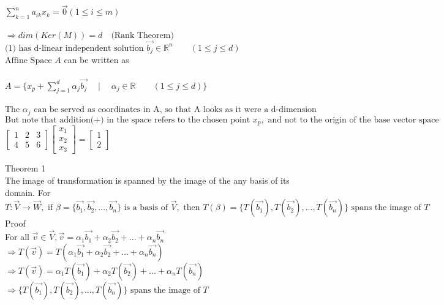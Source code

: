 \documentclass{book}
\begin{document}
$\sum_{k=1}^{n} a_{i k} x_{k} = \vec{0} (1 \leq i \leq m)$\\\\
$\Rightarrow dim(Ker(M)) = d \quad \text{(Rank Theorem)}$\\
$\text{(1) has d-linear independent solution } \vec{b_{j}} \in \mathbb{R}^{n} \quad\quad (1 \leq j \leq d)$\\
$\text{Affine Space }\mathit{A}$ can be written as\\\\ 
$A = \Big\{ x_{p} + \sum_{j=1}^{d}\alpha_{j}\vec{b_{j}} \quad \mid \quad \alpha_{j} \in \mathbb{R} \quad\quad (1 \leq j \leq d)\Big\} $\\\\
$\text{The } \alpha_{j} \text{ can be served as coordinates in A, so that A looks as it were a d-dimension coordiate space.}$\\ 
$\text{But note that addition(+) in the space refers to the chosen point } x_{p}, \text{ and not to the origin of the base vector space}$\\

$
        \begin{bmatrix}
        1 & 2 & 3 \\
        4 & 5 & 6    
        \end{bmatrix}
        \left[
        \begin{array}{c}
        x_1 \\
        x_2 \\
        x_3 
        \end{array}
        \right] = 
        \left[ 
        \begin{array}{c}
        1 \\ 
        2 
        \end{array}
        \right]
$
\newpage

\noindent
Theorem 1\\
The image of transformation is spanned by the image of the any basis of its domain. For $T:\vec{V} \rightarrow \vec{W}, \text{ if } \beta=\{ \vec{b_1},\vec{b_2},...,\vec{b_n} \} \text{ is a basis of }\vec{V}, 
\text{ then }T(\beta) = \{ T(\vec{b_1}), T(\vec{b_2}), ... ,T(\vec{b_n})\} \text{ spans the image of }T$\\

\noindent
Proof\\
For all $\vec{v} \in \vec{V}, \vec{v} = \alpha_1\vec{b_1} + \alpha_2\vec{b_2} + ... + \alpha_n\vec{b_n}$\\
$\Rightarrow T(\vec{v}) = T(\alpha_1\vec{b_1} + \alpha_2\vec{b_2} + ... + \alpha_n\vec{b_n})$\\
$\Rightarrow T(\vec{v}) = \alpha_1 T(\vec{b_1}) + \alpha_2 T(\vec{b_2}) + ... + \alpha_n T(\vec{b_n})$\\
$\Rightarrow \{ T(\vec{b_1}), T(\vec{b_2}),...,T(\vec{b_n})\} \text{ spans the image of }T$\\
\end{document}
